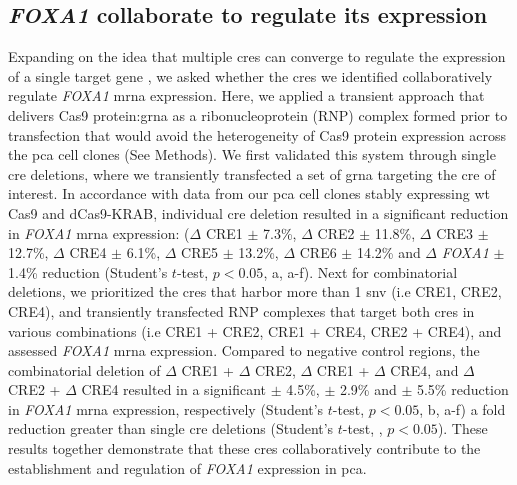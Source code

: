 \subsection{\emph{FOXA1}  collaborate to regulate its expression}

Expanding on the idea that multiple \glspl{cre} can converge to regulate the expression of a single target gene \cite{sallariConvergenceDispersedRegulatory2016,baileyNoncodingSomaticInherited2016,pennacchioEnhancersFiveEssential2013}, we asked whether the \glspl{cre} we identified collaboratively regulate \emph{FOXA1} \gls{mrna} expression.
Here, we applied a transient approach that delivers Cas9 protein:\gls{grna} as a ribonucleoprotein (RNP) complex formed prior to transfection that would avoid the heterogeneity of Cas9 protein expression across the \gls{pca} cell clones (See Methods).
We first validated this system through single \gls{cre} deletions, where we transiently transfected a set of \gls{grna} targeting the \gls{cre} of interest.
In accordance with data from our \gls{pca} cell clones stably expressing \gls{wt} Cas9 and dCas9-KRAB, individual \gls{cre} deletion resulted in a significant reduction in \emph{FOXA1} \gls{mrna} expression: ($\Delta$ CRE1  $\pm$ 7.3\%, $\Delta$ CRE2  $\pm$ 11.8\%, $\Delta$ CRE3  $\pm$ 12.7\%, $\Delta$ CRE4  $\pm$ 6.1\%, $\Delta$ CRE5  $\pm$ 13.2\%, $\Delta$ CRE6  $\pm$ 14.2\% and $\Delta$ \emph{FOXA1}  $\pm$ 1.4\% reduction (Student's $t$-test, $p < 0.05$, a, a-f).
Next for combinatorial deletions, we prioritized the \glspl{cre} that harbor more than 1 \gls{snv} (i.e CRE1, CRE2, CRE4), and transiently transfected RNP complexes that target both \glspl{cre} in various combinations (i.e CRE1 + CRE2, CRE1 + CRE4, CRE2 + CRE4), and assessed \emph{FOXA1} \gls{mrna} expression.
Compared to negative control regions, the combinatorial deletion of $\Delta$ CRE1 + $\Delta$ CRE2, $\Delta$ CRE1 + $\Delta$ CRE4, and $\Delta$ CRE2 + $\Delta$ CRE4 resulted in a significant  $\pm$ 4.5\%,  $\pm$ 2.9\% and  $\pm$ 5.5\% reduction in \emph{FOXA1} \gls{mrna} expression, respectively (Student's $t$-test, $p<0.05$, b, a-f) a fold reduction greater than single \gls{cre} deletions (Student's $t$-test, , $p<0.05$).
These results together demonstrate that these \glspl{cre} collaboratively contribute to the establishment and regulation of \emph{FOXA1} expression in \gls{pca}.

